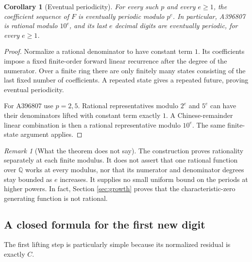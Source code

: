 \documentclass[11pt,letterpaper]{article}
\newtheorem{corollary}[theorem]{Corollary}
\theoremstyle{definition}
\theoremstyle{remark}
\newtheorem{remark}[theorem]{Remark}
\newcommand{\Q}{\mathbb Q}
\begin{document}
\begin{corollary}[Eventual periodicity]\label{cor:periodic}
For every such $p$ and every $e\geq1$, the coefficient sequence of $F$
is eventually periodic modulo $p^e$.  In particular, A396807 is rational
modulo $10^e$, and its last $e$ decimal digits are eventually periodic,
for every $e\geq1$.
\end{corollary}
\begin{proof}
Normalize a rational denominator to have constant term $1$.
Its coefficients impose a fixed finite-order forward linear recurrence
after the degree of the numerator.  Over a finite ring there are only
finitely many states consisting of the last fixed number of
coefficients.  A repeated state gives a repeated future, proving eventual
periodicity.

For A396807 use $p=2,5$.  Rational representatives modulo $2^e$ and
$5^e$ can have their denominators lifted with constant term exactly $1$.
A Chinese-remainder linear combination is then a rational representative
modulo $10^e$.  The same finite-state argument applies.
\end{proof}

\begin{remark}[What the theorem does not say]
The construction proves rationality separately at each finite modulus.
It does not assert that one rational function over $\Q$ works at every
modulus, nor that its numerator and denominator degrees stay bounded as
$e$ increases.  It supplies no small uniform bound on the periods at
higher powers.  In fact, Section \ref{sec:growth} proves that the
characteristic-zero generating function is not rational.
\end{remark}

\subsection{A closed formula for the first new digit}
The first lifting step is particularly simple because its normalized
residual is exactly $C$.
\end{document}
